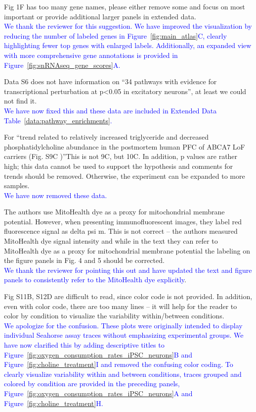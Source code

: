 Fig 1F has too many gene names, please either remove some and focus on most important or provide additional larger panels in extended data.\\
\textcolor{blue}{We thank the reviewer for this suggestion. We have improved the visualization by reducing the number of labeled genes in Figure~\ref{fig:main_atlas}C, clearly highlighting fewer top genes with enlarged labels. Additionally, an expanded view with more comprehensive gene annotations is provided in Figure~\ref{fig:snRNAseq_gene_scores}A.}

Data S6 does not have information on “34 pathways with evidence for transcriptional perturbation at p<0.05 in excitatory neurons”, at least we could not find it.\\
\textcolor{blue}{We have now fixed this and these data are included in Extended Data Table~\ref{data:pathway_enrichments}.}

For “trend related to relatively increased triglyceride and decreased phosphatidylcholine abundance in the postmortem human PFC of ABCA7 LoF carriers (Fig. S9C )”This is not 9C, but 10C. In addition, p values are rather high; this data cannot be used to support the hypothesis and comments for trends should be removed. Otherwise, the experiment can be expanded to more samples.\\
\textcolor{blue}{We have now removed these data.}

The authors use MitoHealth dye as a proxy for mitochondrial membrane potential. However, when presenting immunofluorescent images, they label red fluorescence signal as delta psi m. This is not correct – the authors measured MitoHealth dye signal intensity and while in the text they can refer to MitoHealth dye as a proxy for mitochondrial membrane potential the labeling on the figure panels in Fig. 4 and 5 should be corrected.\\
\textcolor{blue}{We thank the reviewer for pointing this out and have updated the text and figure panels to consistently refer to the MitoHealth dye explicitly}.

Fig S11B, S12D are difficult to read, since color code is not provided. In addition, even with color code, there are too many lines – it will help for the reader to color by condition to visualize the variability within/between conditions.\\
\textcolor{blue}{We apologize for the confusion. These plots were originally intended to display individual Seahorse assay traces without emphasizing experimental groups. We have now clarified this by adding descriptive titles to Figure~\ref{fig:oxygen_consumption_rates_iPSC_neurons}B and Figure~\ref{fig:choline_treatment}I and removed the confusing color coding. To clearly visualize variability within and between conditions, traces grouped and colored by condition are provided in the preceding panels, Figure~\ref{fig:oxygen_consumption_rates_iPSC_neurons}A and Figure~\ref{fig:choline_treatment}H.}

